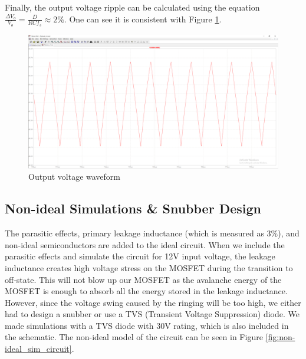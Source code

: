 \documentclass[12pt]{article}
\begin{document}
    Finally, the output voltage ripple can be calculated using the equation $\frac{\Delta V_o}{V_o} = \frac{D}{RC f_s} \approx 2\%$. One can see it is consistent with Figure \ref{fig:ideal_Vo}.

    \begin{figure}[H]
        \centering
        \includegraphics[scale=0.3]{img/Spice_Sim/Ideal/ideal_Vo_ripple_2.6uF.PNG}
        \caption{Output voltage waveform}
        \label{fig:ideal_Vo}
    \end{figure}
    
    \subsection{Non-ideal Simulations \& Snubber Design}
    
    The parasitic effects, primary leakage inductance (which is measured as 3\%), and non-ideal semiconductors are added to the ideal circuit. When we include the parasitic effects and simulate the circuit for 12V input voltage, the leakage inductance creates high voltage stress on the MOSFET during the transition to off-state. This will not blow up our MOSFET as the avalanche energy of the MOSFET is enough to absorb all the energy stored in the leakage inductance. However, since the voltage swing caused by the ringing will be too high, we either had to design a snubber or use a TVS (Transient Voltage Suppression) diode. We made simulations with a TVS diode with 30V rating, which is also included in the schematic. The non-ideal model of the circuit can be seen in Figure \ref{fig:non-ideal_sim_circuit}. \\
\end{document}
